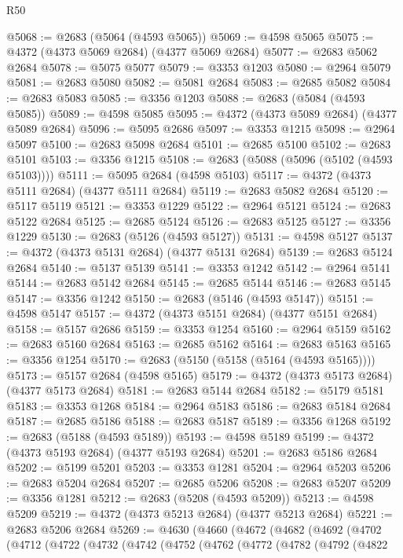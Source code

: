\begin{lexlean}{R50}
\begin{coremodule}
@5068 := @2683 (@5064 (@4593 @5065))
@5069 := @4598 @5065
@5075 := @4372 (@4373 @5069 @2684) (@4377 @5069 @2684)
@5077 := @2683 @5062 @2684
@5078 := @5075 @5077
@5079 := @3353 @1203
@5080 := @2964 @5079
@5081 := @2683 @5080
@5082 := @5081 @2684
@5083 := @2685 @5082
@5084 := @2683 @5083
@5085 := @3356 @1203
@5088 := @2683 (@5084 (@4593 @5085))
@5089 := @4598 @5085
@5095 := @4372 (@4373 @5089 @2684) (@4377 @5089 @2684)
@5096 := @5095 @2686
@5097 := @3353 @1215
@5098 := @2964 @5097
@5100 := @2683 @5098 @2684
@5101 := @2685 @5100
@5102 := @2683 @5101
@5103 := @3356 @1215
@5108 := @2683 (@5088 (@5096 (@5102 (@4593 @5103))))
@5111 := @5095 @2684 (@4598 @5103)
@5117 := @4372 (@4373 @5111 @2684) (@4377 @5111 @2684)
@5119 := @2683 @5082 @2684
@5120 := @5117 @5119
@5121 := @3353 @1229
@5122 := @2964 @5121
@5124 := @2683 @5122 @2684
@5125 := @2685 @5124
@5126 := @2683 @5125
@5127 := @3356 @1229
@5130 := @2683 (@5126 (@4593 @5127))
@5131 := @4598 @5127
@5137 := @4372 (@4373 @5131 @2684) (@4377 @5131 @2684)
@5139 := @2683 @5124 @2684
@5140 := @5137 @5139
@5141 := @3353 @1242
@5142 := @2964 @5141
@5144 := @2683 @5142 @2684
@5145 := @2685 @5144
@5146 := @2683 @5145
@5147 := @3356 @1242
@5150 := @2683 (@5146 (@4593 @5147))
@5151 := @4598 @5147
@5157 := @4372 (@4373 @5151 @2684) (@4377 @5151 @2684)
@5158 := @5157 @2686
@5159 := @3353 @1254
@5160 := @2964 @5159
@5162 := @2683 @5160 @2684
@5163 := @2685 @5162
@5164 := @2683 @5163
@5165 := @3356 @1254
@5170 := @2683 (@5150 (@5158 (@5164 (@4593 @5165))))
@5173 := @5157 @2684 (@4598 @5165)
@5179 := @4372 (@4373 @5173 @2684) (@4377 @5173 @2684)
@5181 := @2683 @5144 @2684
@5182 := @5179 @5181
@5183 := @3353 @1268
@5184 := @2964 @5183
@5186 := @2683 @5184 @2684
@5187 := @2685 @5186
@5188 := @2683 @5187
@5189 := @3356 @1268
@5192 := @2683 (@5188 (@4593 @5189))
@5193 := @4598 @5189
@5199 := @4372 (@4373 @5193 @2684) (@4377 @5193 @2684)
@5201 := @2683 @5186 @2684
@5202 := @5199 @5201
@5203 := @3353 @1281
@5204 := @2964 @5203
@5206 := @2683 @5204 @2684
@5207 := @2685 @5206
@5208 := @2683 @5207
@5209 := @3356 @1281
@5212 := @2683 (@5208 (@4593 @5209))
@5213 := @4598 @5209
@5219 := @4372 (@4373 @5213 @2684) (@4377 @5213 @2684)
@5221 := @2683 @5206 @2684
@5269 := @4630
    (@4660
      (@4672
        (@4682
          (@4692
            (@4702
              (@4712
                (@4722
                  (@4732
                    (@4742
                      (@4752
                        (@4762
                          (@4772
                            (@4782
                              (@4792
                                (@4822

\end{coremodule}
\end{lexlean}
